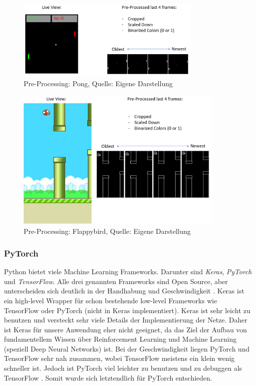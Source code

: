 \documentclass[12pt,a4paper]{article}
\begin{document}
\begin{figure}[!h]
	\centering
	\includegraphics[width=0.8\textwidth]{gfx/pp_pong}
	\caption{Pre-Processing: Pong, Quelle: Eigene Darstellung}
	\label{fig:pract:framework:wrapper:pong}
\end{figure}

\begin{figure}[!h]
	\vspace{3cm}
	
	\centering
	\includegraphics[width=0.9\textwidth]{gfx/pp_flappy}
	\caption{Pre-Processing: Flappybird, Quelle: Eigene Darstellung}
	\label{fig:pract:framework:wrapper:flappy}
\end{figure}

\newpage

\subsubsection{PyTorch}
Python bietet viele Machine Learning Frameworks.
Darunter sind \textit{Keras}, \textit{PyTorch} und \textit{TensorFlow}.
Alle drei genannten Frameworks sind Open Source, aber unterscheiden sich deutlich in der Handhabung und Geschwindigkeit \cite{edureka:ml_frameworks}.
Keras ist ein high-level Wrapper für schon bestehende low-level Frameworks wie TensorFlow oder PyTorch (nicht in Keras implementiert).
Keras ist sehr leicht zu benutzen und versteckt sehr viele Details der Implementierung der Netze.
Daher ist Keras für unsere Anwendung eher nicht geeignet, da das Ziel der Aufbau von fundamentellem Wissen über Reinforcement Learning und Machine Learning (speziell Deep Neural Networks) ist.
Bei der Geschwindigkeit liegen PyTorch und TensorFlow sehr nah zusammen, wobei TensorFlow meistens ein klein wenig schneller ist.
Jedoch ist PyTorch viel leichter zu benutzen und zu debuggen als TensorFlow \cite{edureka:ml_frameworks}.
Somit wurde sich letztendlich für PyTorch entschieden.
\end{document}
